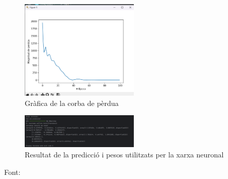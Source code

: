 \begin{figure}[H]
\centering
\includegraphics[width=0.5\textwidth]{./figures/12.png}
\caption{Gràfica de la corba de pèrdua}
\end{figure}

\begin{figure}[H]
\centering
\includegraphics[width=0.5\textwidth]{./figures/13.png}
\caption{Resultat de la predicció i pesos utilitzats per la xarxa neuronal}
\end{figure}

Font: \cite{Xarxa_Neuronal}
